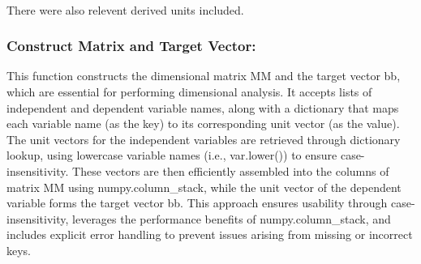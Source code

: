 \documentclass{article}
\begin{document}
\begin{table}[H]
\centering
{}
\caption{SI base and derived units with their corresponding vectorised representations.}
\label{tab:si_units_extended}
\end{table}\\









There were also relevent derived units included.\\ 

\subsubsection{Construct Matrix and Target Vector:}

This function constructs the dimensional matrix MM and the target vector bb, which are essential for performing dimensional analysis. It accepts lists of independent and dependent variable names, along with a dictionary that maps each variable name (as the key) to its corresponding unit vector (as the value). The unit vectors for the independent variables are retrieved through dictionary lookup, using lowercase variable names (i.e., var.lower()) to ensure case-insensitivity. These vectors are then efficiently assembled into the columns of matrix MM using numpy.column\_stack, while the unit vector of the dependent variable forms the target vector bb. This approach ensures usability through case-insensitivity, leverages the performance benefits of numpy.column\_stack, and includes explicit error handling to prevent issues arising from missing or incorrect keys.\\
\end{document}
